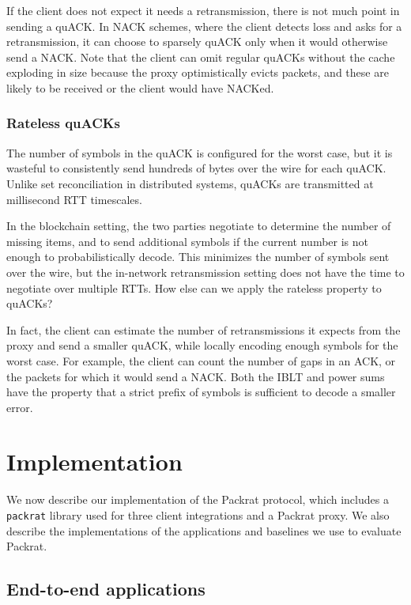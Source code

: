 If the client does not expect it needs a retransmission, there is not much point
in sending a quACK. In NACK schemes, where the client detects loss and asks for
a retransmission, it can choose to sparsely quACK only when it would
otherwise send a NACK. Note that the client can omit regular quACKs without the
cache exploding in size because the proxy optimistically evicts packets, and
these are likely to be received or the client would have NACKed.

\subsubsection{Rateless quACKs}
\label{sec:packrat:receiver:rateless}

The number of symbols in the quACK is configured for the worst case, but it is
wasteful to consistently send hundreds of bytes over the wire for each quACK.
Unlike set reconciliation in distributed systems, quACKs are transmitted at
millisecond RTT timescales.

In the blockchain setting, the two parties negotiate to determine the number of
missing items, and to send additional symbols if the current number is not
enough to probabilistically decode. This minimizes the number of symbols sent
over the wire, but the in-network retransmission setting does not have the time
to negotiate over multiple RTTs. How else can we apply the rateless property to
quACKs?

In fact, the client can estimate the number of retransmissions it expects from
the proxy and send a smaller quACK, while locally encoding enough symbols for
the worst case. For example, the client can count the number of gaps in an ACK,
or the packets for which it would send a NACK. Both the IBLT and power sums
have the property that a strict prefix of symbols is sufficient to decode a
smaller error.

\section{Implementation}
\label{sec:packrat:implementation}

We now describe our implementation of the Packrat protocol, which includes
a \texttt{packrat} library used for three client integrations
and a Packrat proxy. We also describe the implementations of the
applications and baselines we use to evaluate Packrat.

\subsection{End-to-end applications}
\label{sec:packrat:implementation:applications}

